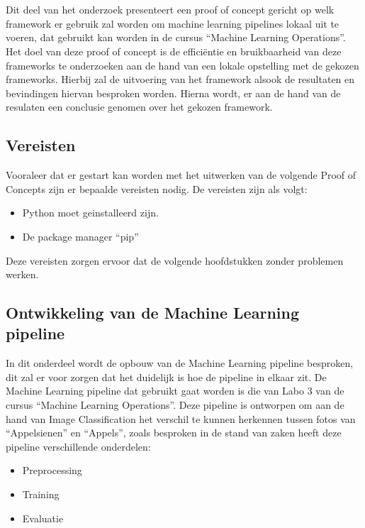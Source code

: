 \chapter{}%
\label{ch:PoC}

Dit deel van het onderzoek presenteert een proof of concept gericht op welk framework er gebruik zal worden om machine learning pipelines lokaal uit te voeren, dat gebruikt kan worden in de cursus ``Machine Learning Operations''.
Het doel van deze proof of concept is de efficiëntie en bruikbaarheid van deze frameworks te onderzoeken aan de hand van een lokale opstelling met de gekozen frameworks. Hierbij zal de uitvoering van het framework alsook de resultaten en bevindingen hiervan besproken worden.
Hierna wordt, er aan de hand van de resulaten een conclusie genomen over het gekozen framework.
\section{Vereisten}
Vooraleer dat er gestart kan worden met het uitwerken van de volgende Proof of Concepts zijn er bepaalde vereisten nodig.
De vereisten zijn als volgt:
\begin{itemize}
    \item Python moet geinstalleerd zijn.
    \item De package manager ``pip''
\end{itemize}
Deze vereisten zorgen ervoor dat de volgende hoofdstukken zonder problemen werken.
\section{Ontwikkeling van de Machine Learning pipeline}
In dit onderdeel wordt de opbouw van de Machine Learning pipeline besproken, dit zal er voor zorgen dat het duidelijk is hoe de pipeline in elkaar zit.
De Machine Learning pipeline dat gebruikt gaat worden is die van Labo 3 van de cursus ``Machine Learning Operations''. Deze pipeline is ontworpen om aan de hand van Image Classification het verschil te kunnen herkennen tussen fotos van ``Appelsienen'' en ``Appels'', zoals besproken in de stand van zaken heeft deze pipeline verschillende onderdelen:

\begin{itemize}
    \item Preprocessing
    \item Training
    \item Evaluatie
\end{itemize}

